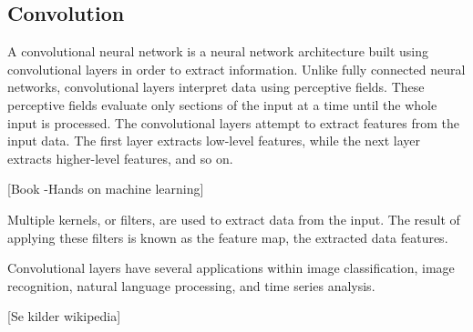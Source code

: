 \subsection{Convolution}
A convolutional neural network is a neural network architecture built using convolutional layers in order to extract information.
Unlike fully connected neural networks, convolutional layers interpret data using perceptive fields.
These perceptive fields evaluate only sections of the input at a time until the whole input is processed.
The convolutional layers attempt to extract features from the input data.
The first layer extracts low-level features, while the next layer extracts higher-level features, and so on.

[Book -Hands on machine learning]

Multiple kernels, or filters, are used to extract data from the input.
The result of applying these filters is known as the feature map, the extracted data features.

Convolutional layers have several applications within image classification,
image recognition, natural language processing, and time series analysis.

[Se kilder wikipedia]